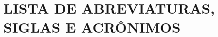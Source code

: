 

\incluirlistadeilustracoes%


\incluirlistadetabelas%



\chapter*{LISTA DE ABREVIATURAS, SIGLAS E ACRÔNIMOS}

